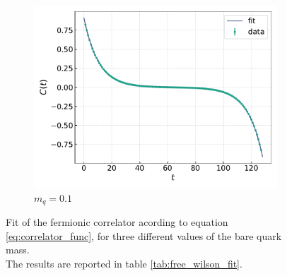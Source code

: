 \begin{figure}[h!]
\begin{subfigure}[b]{0.68\textwidth}
        \includegraphics[width=\textwidth]{figures/correlator/corrs_free/corr_medium.pdf}
        \caption{$m_q = 0.1$}        
    \end{subfigure}
    \caption[Fit of the correlator for free Wilson fermions.]{Fit of the fermionic correlator acording to equation \eqref{eq:correlator_func}, for three different values of the bare quark mass. \\ The results are reported in table \ref{tab:free_wilson_fit}.}
    \label{fig:fit_wilson}
\end{figure}

\newpage

